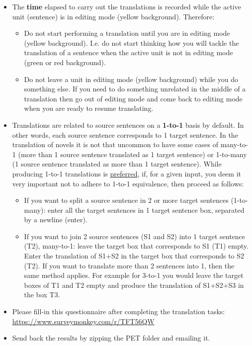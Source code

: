 \documentclass[pdftex,12pt,a4paper]{report} %
\begin{document}
\begin{itemize}
\item The \textbf{time} elapsed to carry out the translations is recorded while the active unit (sentence) is in editing mode (yellow background). Therefore:
	\begin{itemize}
	\item Do not start performing a translation until you are in editing mode (yellow background). I.e. do not start thinking how you will tackle the translation of a sentence when the active unit is not in editing mode (green or red background).
	\item Do not leave a unit in editing mode (yellow background) while you do something else. If you need to do something unrelated in the middle of a translation then go out of editing mode and come back to editing mode when you are ready to resume translating.
	\end{itemize}
	
\item Translations are related to source sentences on a \textbf{1-to-1} basis by default. In other words, each source sentence corresponds to 1 target sentence. In the translation of novels it is not that uncommon to have some cases of many-to-1 (more than 1 source sentence translated as 1 target sentence) or 1-to-many (1 source sentence translated as more than 1 target sentence). While producing 1-to-1 translations is \underline{preferred}, if, for a given input, you deem it very important not to adhere to 1-to-1 equivalence, then proceed as follows:
	\begin{itemize}
	\item If you want to split a source sentence in 2 or more target sentences (1-to-many): enter all the target sentences in 1 target sentence box, separated by a newline (enter).
	\item If you want to join 2 source sentences (S1 and S2) into 1 target sentence (T2), many-to-1: leave the target box that corresponds to S1 (T1) empty. Enter the translation of S1+S2 in the target box that corresponds to S2 (T2). If you want to translate more than 2 sentences into 1, then the same method applies. For example for 3-to-1 you would leave the target boxes of T1 and T2 empty and produce the translation of S1+S2+S3 in the box T3.
	\end{itemize}

\item Please fill-in this questionnaire after completing the translation tasks: \url{https://www.surveymonkey.com/r/TFT56QW}

\item Send back the results by zipping the PET folder and emailing it.
\end{itemize}
\end{document}
